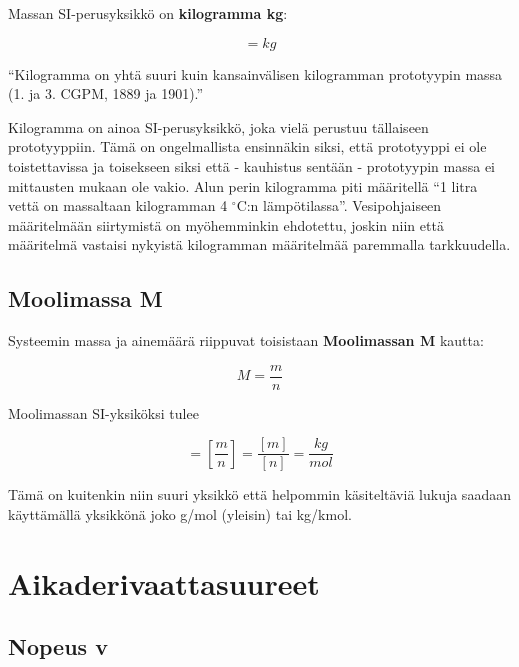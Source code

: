 \documentclass[12pt,a4paper,finnish]{book}
\begin{document}
Massan SI-perusyksikkö on \textbf{kilogramma kg}:

\begin{equation}
 [m] = kg
\end{equation}

``Kilogramma on yhtä suuri kuin kansainvälisen kilogramman prototyypin massa (1. ja 3. CGPM, 1889 ja 1901).''

Kilogramma on ainoa SI-perusyksikkö, joka vielä perustuu tällaiseen prototyyppiin. Tämä on ongelmallista ensinnäkin 
siksi, että prototyyppi ei ole toistettavissa ja toisekseen siksi että - kauhistus sentään - prototyypin massa 
ei mittausten mukaan ole vakio. Alun perin kilogramma piti määritellä ``1 litra vettä on massaltaan kilogramman 
4 $^{\circ}$C:n lämpötilassa''. Vesipohjaiseen määritelmään siirtymistä on myöhemminkin ehdotettu, joskin niin että 
määritelmä vastaisi nykyistä kilogramman määritelmää paremmalla tarkkuudella.

\subsection{Moolimassa M}

Systeemin massa ja ainemäärä riippuvat toisistaan \textbf{Moolimassan M} kautta:

\begin{equation}
 M = \frac{m}{n}
\end{equation}

Moolimassan SI-yksiköksi tulee

\begin{equation}
 [M] = \left[\frac{m}{n}\right] = \frac{[m]}{[n]} = \frac{kg}{mol}
\end{equation}

Tämä on kuitenkin niin suuri yksikkö että helpommin käsiteltäviä lukuja saadaan käyttämällä yksikkönä joko 
g/mol (yleisin) tai kg/kmol.

\section{Aikaderivaattasuureet} %



\subsection{Nopeus v}
\end{document}
